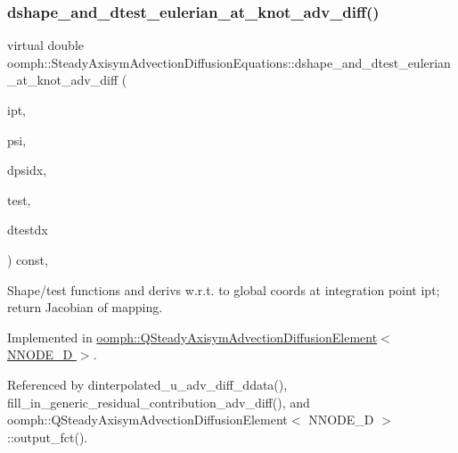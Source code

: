 \subsubsection{\texorpdfstring{dshape\+\_\+and\+\_\+dtest\+\_\+eulerian\+\_\+at\+\_\+knot\+\_\+adv\+\_\+diff()}{dshape\_and\_dtest\_eulerian\_at\_knot\_adv\_diff()}}
{\footnotesize\ttfamily virtual double oomph\+::\+Steady\+Axisym\+Advection\+Diffusion\+Equations\+::dshape\+\_\+and\+\_\+dtest\+\_\+eulerian\+\_\+at\+\_\+knot\+\_\+adv\+\_\+diff (\begin{DoxyParamCaption}\item[{const unsigned \&}]{ipt,  }\item[{\hyperlink{classoomph_1_1Shape}{Shape} \&}]{psi,  }\item[{\hyperlink{classoomph_1_1DShape}{D\+Shape} \&}]{dpsidx,  }\item[{\hyperlink{classoomph_1_1Shape}{Shape} \&}]{test,  }\item[{\hyperlink{classoomph_1_1DShape}{D\+Shape} \&}]{dtestdx }\end{DoxyParamCaption}) const\hspace{0.3cm}{\ttfamily [protected]}, {}}



Shape/test functions and derivs w.\+r.\+t. to global coords at integration point ipt; return Jacobian of mapping. 



Implemented in \hyperlink{classoomph_1_1QSteadyAxisymAdvectionDiffusionElement_aa4c9a7d6ebe2fcc8400d3309d508e2a9}{oomph\+::\+Q\+Steady\+Axisym\+Advection\+Diffusion\+Element$<$ N\+N\+O\+D\+E\+\_\+D $>$}.



Referenced by dinterpolated\+\_\+u\+\_\+adv\+\_\+diff\+\_\+ddata(), fill\+\_\+in\+\_\+generic\+\_\+residual\+\_\+contribution\+\_\+adv\+\_\+diff(), and oomph\+::\+Q\+Steady\+Axisym\+Advection\+Diffusion\+Element$<$ N\+N\+O\+D\+E\+\_\+D $>$\+::output\+\_\+fct().

\mbox{\label{classoomph_1_1SteadyAxisymAdvectionDiffusionEquations_afb560268691d5b469b8998a6dfe758b8}} 
